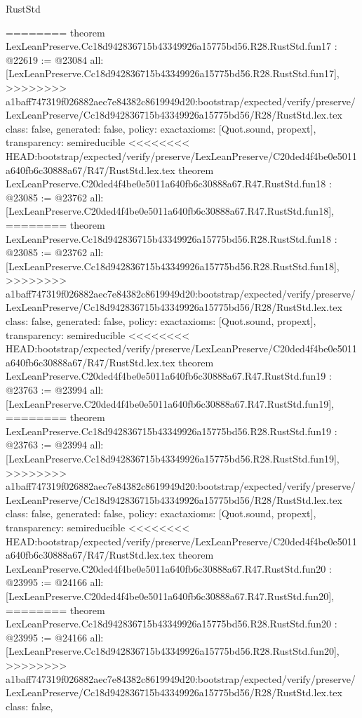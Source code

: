 \begin{lexlean}{RustStd}
\begin{coremodule}
{\begin{coremodule}
{{{{{{{{{{{{{{{{{{{{========
theorem LexLeanPreserve.Cc18d942836715b43349926a15775bd56.R28.RustStd.fun17 : @22619 := @23084 {
  all: [LexLeanPreserve.Cc18d942836715b43349926a15775bd56.R28.RustStd.fun17],
>>>>>>>> a1baff747319f026882aec7e84382c8619949d20:bootstrap/expected/verify/preserve/LexLeanPreserve/Cc18d942836715b43349926a15775bd56/R28/RustStd.lex.tex
  class: false,
  generated: false,
  policy: exact{axioms: [Quot.sound, propext]},
  transparency: semireducible
}
<<<<<<<< HEAD:bootstrap/expected/verify/preserve/LexLeanPreserve/C20ded4f4be0e5011a640fb6c30888a67/R47/RustStd.lex.tex
theorem LexLeanPreserve.C20ded4f4be0e5011a640fb6c30888a67.R47.RustStd.fun18 : @23085 := @23762 {
  all: [LexLeanPreserve.C20ded4f4be0e5011a640fb6c30888a67.R47.RustStd.fun18],
========
theorem LexLeanPreserve.Cc18d942836715b43349926a15775bd56.R28.RustStd.fun18 : @23085 := @23762 {
  all: [LexLeanPreserve.Cc18d942836715b43349926a15775bd56.R28.RustStd.fun18],
>>>>>>>> a1baff747319f026882aec7e84382c8619949d20:bootstrap/expected/verify/preserve/LexLeanPreserve/Cc18d942836715b43349926a15775bd56/R28/RustStd.lex.tex
  class: false,
  generated: false,
  policy: exact{axioms: [Quot.sound, propext]},
  transparency: semireducible
}
<<<<<<<< HEAD:bootstrap/expected/verify/preserve/LexLeanPreserve/C20ded4f4be0e5011a640fb6c30888a67/R47/RustStd.lex.tex
theorem LexLeanPreserve.C20ded4f4be0e5011a640fb6c30888a67.R47.RustStd.fun19 : @23763 := @23994 {
  all: [LexLeanPreserve.C20ded4f4be0e5011a640fb6c30888a67.R47.RustStd.fun19],
========
theorem LexLeanPreserve.Cc18d942836715b43349926a15775bd56.R28.RustStd.fun19 : @23763 := @23994 {
  all: [LexLeanPreserve.Cc18d942836715b43349926a15775bd56.R28.RustStd.fun19],
>>>>>>>> a1baff747319f026882aec7e84382c8619949d20:bootstrap/expected/verify/preserve/LexLeanPreserve/Cc18d942836715b43349926a15775bd56/R28/RustStd.lex.tex
  class: false,
  generated: false,
  policy: exact{axioms: [Quot.sound, propext]},
  transparency: semireducible
}
<<<<<<<< HEAD:bootstrap/expected/verify/preserve/LexLeanPreserve/C20ded4f4be0e5011a640fb6c30888a67/R47/RustStd.lex.tex
theorem LexLeanPreserve.C20ded4f4be0e5011a640fb6c30888a67.R47.RustStd.fun20 : @23995 := @24166 {
  all: [LexLeanPreserve.C20ded4f4be0e5011a640fb6c30888a67.R47.RustStd.fun20],
========
theorem LexLeanPreserve.Cc18d942836715b43349926a15775bd56.R28.RustStd.fun20 : @23995 := @24166 {
  all: [LexLeanPreserve.Cc18d942836715b43349926a15775bd56.R28.RustStd.fun20],
>>>>>>>> a1baff747319f026882aec7e84382c8619949d20:bootstrap/expected/verify/preserve/LexLeanPreserve/Cc18d942836715b43349926a15775bd56/R28/RustStd.lex.tex
  class: false,
}}}}}}}}}}}}}}}}}}}}}}}}
\end{coremodule}}
\end{coremodule}
\end{lexlean}
